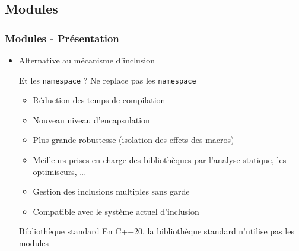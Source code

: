 \documentclass[C++.tex]{subfiles}
\begin{document}
\subsection*{Modules}
\begin{frame}[fragile]
	\frametitle{Modules - Présentation}
	\begin{itemize}

		\item Alternative au mécanisme d'inclusion

		\begin{alertblock}{Et les \lstinline|namespace| ?}
			Ne replace pas les \lstinline|namespace|
		\end{alertblock}

		\begin{itemize}
			\item Réduction des temps de compilation


			\item Nouveau niveau d'encapsulation
			\item Plus grande robustesse (isolation des effets des macros)
			\item Meilleurs prises en charge des bibliothèques par l'analyse statique, les optimiseurs, \ldots
			\item Gestion des inclusions multiples sans garde
			\item Compatible avec le système actuel d'inclusion

		\end{itemize}

		\begin{alertblock}{Bibliothèque standard}
			En C++20, la bibliothèque standard n'utilise pas les modules


		\end{alertblock}
	\end{itemize}
\end{frame}
\end{document}
